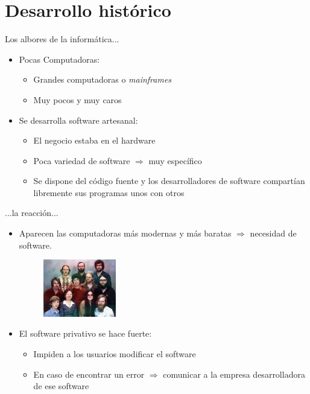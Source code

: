 \documentclass{beamer}
\begin{document}
\section{Desarrollo histórico}


\begin{frame}{Los albores de la informática...}

  \begin{itemize}
  \item Pocas Computadoras:
    \begin{itemize}
    \item Grandes computadoras o \textit{mainframes}
    \item Muy pocos y muy caros
    \end{itemize}

  \item Se desarrolla software artesanal:
    \begin{itemize}
    \item El negocio estaba en el hardware
    \item Poca variedad de software $\Rightarrow$ muy específico
    \item Se dispone del código fuente y los desarrolladores de             software compartían       libremente sus programas unos con otros
    \end{itemize}
  \end{itemize}
\end{frame}


\begin{frame}{...la reacción...}
  \pause
  \begin{itemize}
  \item Aparecen las computadoras más modernas y más baratas         $\Rightarrow$ necesidad de     software.
    \begin{figure}
      \centering
      \includegraphics[width=0.3\textwidth]{pics/microsoft1978ew7.jpg}
    \end{figure}
  \pause
  \item El software privativo se hace fuerte:
    \begin{itemize}
    \item Impiden a los usuarios modificar el software
    \item En caso de encontrar un error $\Rightarrow$ comunicar a la             empresa       desarrolladora de ese software
    \end{itemize}
  \end{itemize}
\end{frame}
\end{document}
